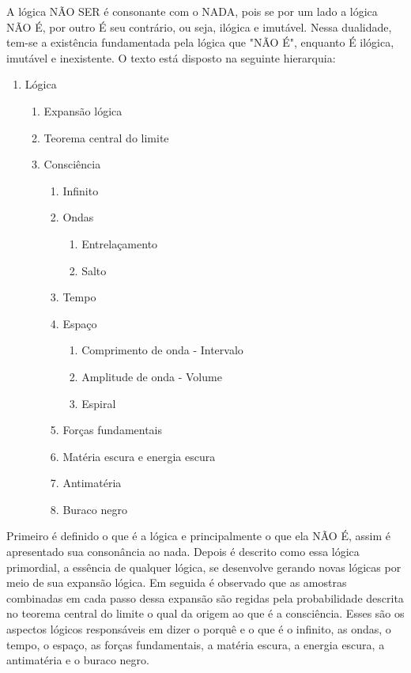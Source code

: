 A lógica NÃO SER é consonante com o NADA, pois se por um lado a lógica NÃO É, por outro É seu contrário, ou seja, ilógica e imutável. Nessa dualidade, tem-se a existência fundamentada pela lógica que "NÃO É", enquanto É ilógica, imutável e inexistente. O texto está disposto na seguinte hierarquia:
	\begin{enumerate}[label*=\arabic*.]
	   \item Lógica
	   \begin{enumerate}[label*=\arabic*.]
		   \item Expansão lógica
		   \item Teorema central do limite
		   \item Consciência
			   \begin{enumerate}[label*=\arabic*.]
				   \item Infinito
				   \item Ondas 
				   \begin{enumerate}[label*=\arabic*.]
				   		\item Entrelaçamento
				   		\item Salto
				   \end{enumerate}  
				   \item Tempo
				   \item Espaço
				   \begin{enumerate}[label*=\arabic*.]
				   		\item Comprimento de onda - Intervalo
					    \item Amplitude de onda - Volume
				   		\item Espiral
				   \end{enumerate} 
				   \item Forças fundamentais
				   \item Matéria escura e energia escura
				   \item Antimatéria
				   \item Buraco negro
			   \end{enumerate}   
	   \end{enumerate}
	\end{enumerate}

Primeiro é definido o que é a lógica e principalmente o que ela NÃO É, assim é apresentado sua consonância ao nada. Depois é descrito como essa lógica primordial, a essência de qualquer lógica, se desenvolve gerando novas lógicas por meio de sua expansão lógica. Em seguida é observado que as amostras combinadas em cada passo dessa expansão são regidas pela probabilidade descrita no teorema central do limite o qual da origem ao que é a consciência. Esses são os aspectos lógicos responsáveis em dizer o porquê e o que é o infinito, as ondas, o tempo, o espaço, as forças fundamentais, a matéria escura, a energia escura, a antimatéria e o buraco negro. 

\bigbreak